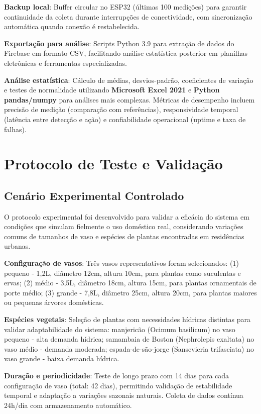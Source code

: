 \textbf{Backup local}: Buffer circular no ESP32 (últimas 100 medições) para garantir continuidade da coleta durante interrupções de conectividade, com sincronização automática quando conexão é restabelecida.

\textbf{Exportação para análise}: Scripts Python 3.9 para extração de dados do Firebase em formato CSV, facilitando análise estatística posterior em planilhas eletrônicas e ferramentas especializadas.

\textbf{Análise estatística}: Cálculo de médias, desvios-padrão, coeficientes de variação e testes de normalidade utilizando \textbf{Microsoft Excel 2021} e \textbf{Python pandas/numpy} para análises mais complexas. Métricas de desempenho incluem precisão de medição (comparação com referências), responsividade temporal (latência entre detecção e ação) e confiabilidade operacional (uptime e taxa de falhas).

\section{Protocolo de Teste e Validação}

\subsection{Cenário Experimental Controlado}

O protocolo experimental foi desenvolvido para validar a eficácia do sistema em condições que simulam fielmente o uso doméstico real, considerando variações comuns de tamanhos de vaso e espécies de plantas encontradas em residências urbanas.

\textbf{Configuração de vasos}: Três vasos representativos foram selecionados: (1) pequeno - 1,2L, diâmetro 12cm, altura 10cm, para plantas como suculentas e ervas; (2) médio - 3,5L, diâmetro 18cm, altura 15cm, para plantas ornamentais de porte médio; (3) grande - 7,8L, diâmetro 25cm, altura 20cm, para plantas maiores ou pequenas árvores domésticas.

\textbf{Espécies vegetais}: Seleção de plantas com necessidades hídricas distintas para validar adaptabilidade do sistema: manjericão (Ocimum basilicum) no vaso pequeno - alta demanda hídrica; samambaia de Boston (Nephrolepis exaltata) no vaso médio - demanda moderada; espada-de-são-jorge (Sansevieria trifasciata) no vaso grande - baixa demanda hídrica.

\textbf{Duração e periodicidade}: Teste de longo prazo com 14 dias para cada configuração de vaso (total: 42 dias), permitindo validação de estabilidade temporal e adaptação a variações sazonais naturais. Coleta de dados contínua 24h/dia com armazenamento automático.

